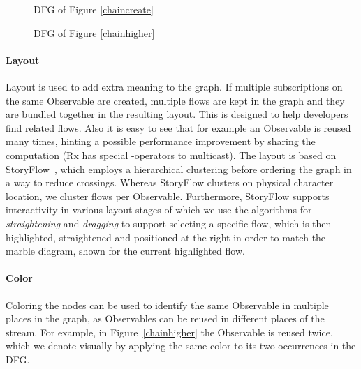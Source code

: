 \begin{figure}[ht]
	\centering
	
	\caption{DFG of Figure \ref{chaincreate}}
	\label{fiddlesimple}
\end{figure}

\begin{figure}[ht]
	\centering
	
	\caption{DFG of Figure \ref{chainhigher}}
	\label{fiddlehigher}
\end{figure}

\paragraph{Layout} Layout is used to add extra meaning to the graph. If multiple subscriptions on the same Observable are created, multiple flows are kept in the graph and they are bundled together in the resulting layout. This is designed to help developers find related flows. Also it is easy to see that for example an Observable is reused many times, hinting a possible performance improvement by sharing the computation (Rx has special -operators to multicast). The layout is based on StoryFlow~\cite{liu2013storyflow}, which employs a hierarchical clustering before ordering the graph in a way to reduce crossings. Whereas StoryFlow clusters on physical character location, we cluster flows per Observable. Furthermore, StoryFlow supports interactivity in various layout stages of which we use the algorithms for \emph{straightening} and \emph{dragging} to support selecting a specific flow, which is then highlighted, straightened and positioned at the right in order to match the marble diagram, shown for the current highlighted flow.

\paragraph{Color} Coloring the nodes can be used to identify the same Observable in multiple places in the graph, as Observables can be reused in different places of the stream. For example, in Figure~\ref{chainhigher} the  Observable is reused twice, which we denote visually by applying the same color to its two occurrences in the DFG.

